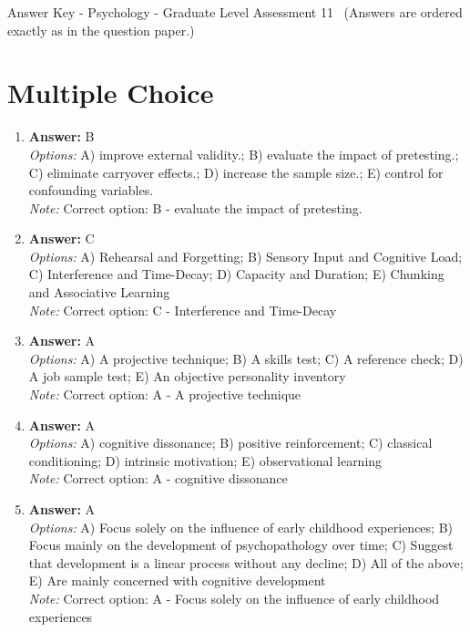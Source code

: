 \documentclass[12pt]{article}
\begin{document}
\begin{center}
Answer Key - Psychology - Graduate Level Assessment 11 \
\small (Answers are ordered exactly as in the question paper.)
\end{center}

\section*{Multiple Choice}
\begin{enumerate}[label=\arabic*.]
\item \textbf{Answer:} B
\\ \textit{Options:} A) improve external validity.; B) evaluate the impact of pretesting.; C) eliminate carryover effects.; D) increase the sample size.; E) control for confounding variables.
\\ \textit{Note:} Correct option: B - evaluate the impact of pretesting.
\item \textbf{Answer:} C
\\ \textit{Options:} A) Rehearsal and Forgetting; B) Sensory Input and Cognitive Load; C) Interference and Time-Decay; D) Capacity and Duration; E) Chunking and Associative Learning
\\ \textit{Note:} Correct option: C - Interference and Time-Decay
\item \textbf{Answer:} A
\\ \textit{Options:} A) A projective technique; B) A skills test; C) A reference check; D) A job sample test; E) An objective personality inventory
\\ \textit{Note:} Correct option: A - A projective technique
\item \textbf{Answer:} A
\\ \textit{Options:} A) cognitive dissonance; B) positive reinforcement; C) classical conditioning; D) intrinsic motivation; E) observational learning
\\ \textit{Note:} Correct option: A - cognitive dissonance
\item \textbf{Answer:} A
\\ \textit{Options:} A) Focus solely on the influence of early childhood experiences; B) Focus mainly on the development of psychopathology over time; C) Suggest that development is a linear process without any decline; D) All of the above; E) Are mainly concerned with cognitive development
\\ \textit{Note:} Correct option: A - Focus solely on the influence of early childhood experiences
\end{enumerate}
\end{document}
